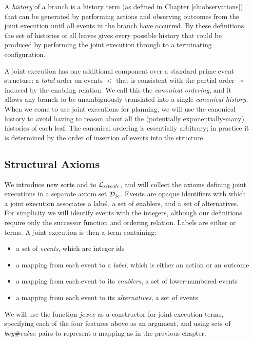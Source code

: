 A \emph{history} of a branch is a history term (as defined in Chapter
\ref{ch:observations}) that can be generated by performing actions
and observing outcomes from the joint execution until all events in
the branch have occurred. By these definitions, the set of histories
of all leaves gives every possible history that could be produced
by performing the joint execution through to a terminating configuration.

A joint execution has one additional component over a standard prime
event structure: a \emph{total} order on events $<$ that is consistent
with the partial order $\prec$ induced by the enabling relation.
We call this the \emph{canonical ordering}, and it allows any branch
to be unambiguously translated into a single \emph{canonical history}.
When we come to use joint executions for planning, we will use the
canonical history to avoid having to reason about all the (potentially
exponentially-many) histories of each leaf. The canonical ordering
is essentially arbitrary; in practice it is determined by the order
of insertion of events into the structure.


\subsection{Structural Axioms}

We introduce new sorts and  to $\mathcal{L}_{sitcalc}$,
and will collect the axioms defining joint executions in a separate
axiom set $\mathcal{D}_{je}$. Events are opaque identifiers with which a
joint execution associates a label, a set of enablers, and a set of
alternatives. For simplicity we will identify events with the integers,
although our definitions require only the successor function and ordering
relation. Labels are either  or  terms.
A joint execution is then a term containing:

\begin{itemize}
\item a set of \emph{events}, which are integer ids 
\item a mapping from each event to a \emph{label}, which is either an action
or an outcome 
\item a mapping from each event to its \emph{enablers}, a set of lower-numbered
events 
\item a mapping from each event to its \emph{alternatives}, a set of events 
\end{itemize}
We will use the function $jexec$ as a constructor for joint execution
terms, specifying each of the four features above as an argument,
and using sets of $key\#value$ pairs to represent a mapping as in
the previous chapter.

